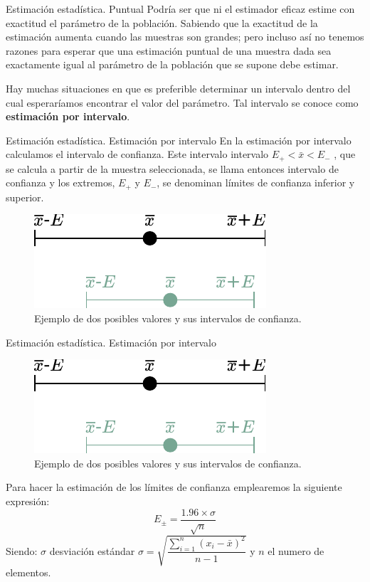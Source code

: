 \documentclass[11pt]{beamer}
\begin{document}
        \begin{frame}{Estimación estadística. Puntual}
          Podría ser que ni el estimador eficaz estime con exactitud el parámetro de la población. Sabiendo que la exactitud de la estimación aumenta cuando las muestras son grandes; pero incluso así no tenemos razones para esperar que una estimación puntual de una muestra dada sea exactamente igual al parámetro de la población que se
supone debe estimar.

          \vspace{15px}
          Hay muchas situaciones en que es preferible determinar un intervalo dentro del cual esperaríamos encontrar el valor del parámetro. Tal intervalo se conoce como \textbf{estimación por intervalo}.
        \end{frame}
        \begin{frame}{Estimación estadística. Estimación por intervalo}
           En la estimación por intervalo calculamos el intervalo de confianza. Este intervalo intervalo $E_{+}< \bar {x} < E_{-}$ , que se calcula a partir de la muestra seleccionada, se llama entonces intervalo de confianza y los extremos, $E_{+}$ y $E_{-}$, se denominan límites de confianza inferior y superior.

          \begin{figure}
              \centering
              \includegraphics[width=0.5\linewidth]{images/inferencial1}
              \caption{Ejemplo de dos posibles valores y sus intervalos de confianza.}
              \label{fig:inferencial1}
          \end{figure}
        \end{frame}

        \begin{frame}{Estimación estadística. Estimación por intervalo}
            \begin{figure}
                \centering
                \includegraphics[width=0.5\linewidth]{images/inferencial1}
                \caption{Ejemplo de dos posibles valores y sus intervalos de confianza.}
                \label{fig:inferencial11}
            \end{figure}
            Para hacer la estimación de los límites de confianza emplearemos la siguiente expresión:
            $$E_{\pm}=\dfrac{1.96 \times \sigma}{\sqrt{n}} $$
            Siendo: $\sigma$ desviación estándar $\sigma=\sqrt{\dfrac{\sum _{i=1}^{n}(x_i- \bar{x})^2}{n-1}}$ y $n$ el numero de elementos.
        \end{frame}
\end{document}
